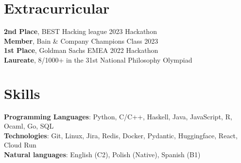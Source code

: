 \documentclass[letterpaper,11pt]{article}
\begin{document}
\section{Extracurricular}
\begin{itemize}[leftmargin=0.15in, label={}]
  \small{\item{
                \textbf{2nd Place}{, BEST Hacking league 2023 Hackathon} \\
                \textbf{Member}{, Bain \& Company Champions Class 2023} \\
                \textbf{1st Place}{, Goldman Sachs EMEA 2022 Hackathon} \\
                \textbf{Laureate}{, 8/1000+ in the 31st National Philosophy Olympiad} \\
          }}
\end{itemize}
\vspace{-16pt}

\section{Skills}
\begin{itemize}[leftmargin=0.15in, label={}]
  \small{\item{
                \textbf{Programming Languages}{: Python, C/C++, Haskell, Java, JavaScript, R,  Ocaml, Go, SQL} \\
                \textbf{Technologies}{: Git, Linux, Jira, Redis, Docker, Pydantic, Huggingface, React, Cloud Run} \\
                \textbf{Natural languages}{: English (C2), Polish (Native), Spanish (B1) } \\
          }}
\end{itemize}
\vspace{-16pt}
\end{document}
